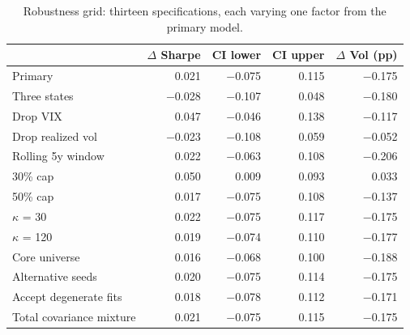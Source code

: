 \begin{table}[htbp]
\caption{Robustness grid: thirteen specifications, each varying one factor from the primary model.}
\label{tab:table4_robustness_grid}
\small
\begin{tabular}{lrrrr}
\toprule
 & $\Delta$ Sharpe & CI lower & CI upper & $\Delta$ Vol (pp) \\
\midrule
Primary & 0.021 & $-$0.075 & 0.115 & $-$0.175 \\
Three states & $-$0.028 & $-$0.107 & 0.048 & $-$0.180 \\
Drop VIX & 0.047 & $-$0.046 & 0.138 & $-$0.117 \\
Drop realized vol & $-$0.023 & $-$0.108 & 0.059 & $-$0.052 \\
Rolling 5y window & 0.022 & $-$0.063 & 0.108 & $-$0.206 \\
30\% cap & 0.050 & 0.009 & 0.093 & 0.033 \\
50\% cap & 0.017 & $-$0.075 & 0.108 & $-$0.137 \\
$\kappa$ = 30 & 0.022 & $-$0.075 & 0.117 & $-$0.175 \\
$\kappa$ = 120 & 0.019 & $-$0.074 & 0.110 & $-$0.177 \\
Core universe & 0.016 & $-$0.068 & 0.100 & $-$0.188 \\
Alternative seeds & 0.020 & $-$0.075 & 0.114 & $-$0.175 \\
Accept degenerate fits & 0.018 & $-$0.078 & 0.112 & $-$0.171 \\
Total covariance mixture & 0.021 & $-$0.075 & 0.115 & $-$0.175 \\
\bottomrule
\end{tabular}
\end{table}
